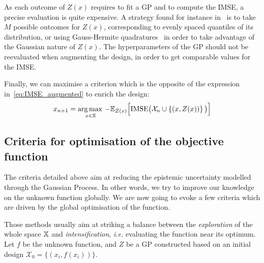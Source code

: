 \documentclass[../../Main_ManuscritThese.tex]{subfiles}
\newcommand\imgpath{/home/victor/acadwriting/Manuscrit/Text/Chapter4/img/}
\begin{document}
As each outcome of $Z(x)$ requires to fit a GP and to compute the
IMSE, a precise evaluation is quite expensive. A strategy found for
instance in~\cite{villemonteix_informational_2006} is to take $M$
possible outcomes for $Z(x)$, corresponding to evenly spaced quantiles
of its distribution, or using Gauss-Hermite
quadratures~\citep{bernard_methodes_2019} in order to take advantage
of the Gaussian nature of $Z(x)$. The hyperparameters of the GP should
not be reevaluated when augmenting the design, in order to get
comparable values for the IMSE.\@

Finally, we can maximise a criterion which is the opposite of the
expression in~\cref{eq:IMSE_augmented} to enrich the design:
\begin{equation}
  x_{n+1} = \operatorname*{arg\,max \,}_{x\in \mathbb{X}}-\mathbb{E}_{Z(x)}\Big[\mathrm{IMSE} \big(\mathcal{X}_n \cup \left\{(x, Z(x))\right\} \big)\Big]
\end{equation}

%   


\subsection{Criteria for optimisation of the objective function}
\label{sec:GP_optimization_criteria}
The criteria detailed above aim at reducing the epistemic uncertainty
modelled through the Gaussian Process. In other words, we try to
improve our knowledge on the unknown function globally. We are now
going to evoke a few criteria which are driven by the global
optimisation of the function.

Those methods usually aim at striking a balance between the
\emph{exploration} of the whole space $\mathbb{X}$ and
\emph{intensification}, \textit{i.e.} evaluating the function near its
optimum.  Let $f$ be the unknown function, and $Z$ be a GP constructed
based on an initial design $\mathcal{X}_0 = \{(x_i, f(x_i))\}$.
\end{document}
